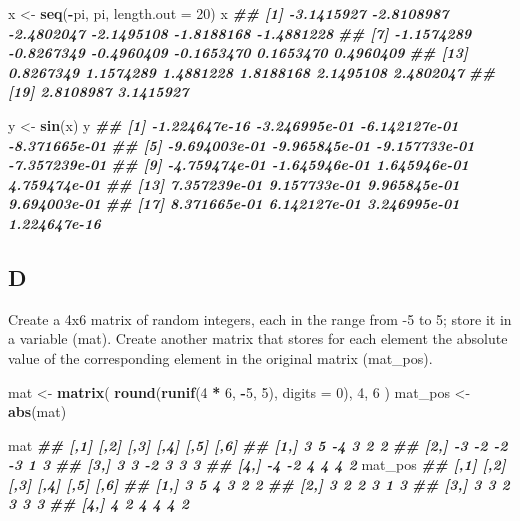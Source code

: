 \documentclass[
]{article}
\newenvironment{Shaded}{\begin{snugshade}}{\end{snugshade}}
\newcommand{\AttributeTok}[1]{\textcolor[rgb]{0.13,0.29,0.53}{#1}}
\newcommand{\DecValTok}[1]{\textcolor[rgb]{0.00,0.00,0.81}{#1}}
\newcommand{\DocumentationTok}[1]{\textcolor[rgb]{0.56,0.35,0.01}{\textbf{\textit{#1}}}}
\newcommand{\FunctionTok}[1]{\textcolor[rgb]{0.13,0.29,0.53}{\textbf{#1}}}
\newcommand{\NormalTok}[1]{#1}
\newcommand{\OtherTok}[1]{\textcolor[rgb]{0.56,0.35,0.01}{#1}}
\newcommand{\SpecialCharTok}[1]{\textcolor[rgb]{0.81,0.36,0.00}{\textbf{#1}}}
\begin{document}
\begin{Shaded}
\begin{Highlighting}[]
\NormalTok{x }\OtherTok{\textless{}{-}} \FunctionTok{seq}\NormalTok{(}\SpecialCharTok{{-}}\NormalTok{pi, pi, }\AttributeTok{length.out =} \DecValTok{20}\NormalTok{)}
\NormalTok{x}
\DocumentationTok{\#\#  [1] {-}3.1415927 {-}2.8108987 {-}2.4802047 {-}2.1495108 {-}1.8188168 {-}1.4881228}
\DocumentationTok{\#\#  [7] {-}1.1574289 {-}0.8267349 {-}0.4960409 {-}0.1653470  0.1653470  0.4960409}
\DocumentationTok{\#\# [13]  0.8267349  1.1574289  1.4881228  1.8188168  2.1495108  2.4802047}
\DocumentationTok{\#\# [19]  2.8108987  3.1415927}

\NormalTok{y }\OtherTok{\textless{}{-}} \FunctionTok{sin}\NormalTok{(x)}
\NormalTok{y}
\DocumentationTok{\#\#  [1] {-}1.224647e{-}16 {-}3.246995e{-}01 {-}6.142127e{-}01 {-}8.371665e{-}01}
\DocumentationTok{\#\#  [5] {-}9.694003e{-}01 {-}9.965845e{-}01 {-}9.157733e{-}01 {-}7.357239e{-}01}
\DocumentationTok{\#\#  [9] {-}4.759474e{-}01 {-}1.645946e{-}01  1.645946e{-}01  4.759474e{-}01}
\DocumentationTok{\#\# [13]  7.357239e{-}01  9.157733e{-}01  9.965845e{-}01  9.694003e{-}01}
\DocumentationTok{\#\# [17]  8.371665e{-}01  6.142127e{-}01  3.246995e{-}01  1.224647e{-}16}
\end{Highlighting}
\end{Shaded}

\hypertarget{d}{%
\subsection{D}\label{d}}

Create a 4x6 matrix of random integers, each in the range from -5 to 5;
store it in a variable (mat). Create another matrix that stores for each
element the absolute value of the corresponding element in the original
matrix (mat\_pos).

\begin{Shaded}
\begin{Highlighting}[]
\NormalTok{mat }\OtherTok{\textless{}{-}} \FunctionTok{matrix}\NormalTok{(}
  \FunctionTok{round}\NormalTok{(}\FunctionTok{runif}\NormalTok{(}\DecValTok{4} \SpecialCharTok{*} \DecValTok{6}\NormalTok{, }\SpecialCharTok{{-}}\DecValTok{5}\NormalTok{, }\DecValTok{5}\NormalTok{), }\AttributeTok{digits =} \DecValTok{0}\NormalTok{),}
  \DecValTok{4}\NormalTok{,}
  \DecValTok{6}
\NormalTok{)}
\NormalTok{mat\_pos }\OtherTok{\textless{}{-}} \FunctionTok{abs}\NormalTok{(mat)}

\NormalTok{mat}
\DocumentationTok{\#\#      [,1] [,2] [,3] [,4] [,5] [,6]}
\DocumentationTok{\#\# [1,]    3    5   {-}4    3    2    2}
\DocumentationTok{\#\# [2,]   {-}3   {-}2   {-}2   {-}3    1    3}
\DocumentationTok{\#\# [3,]    3    3   {-}2    3    3    3}
\DocumentationTok{\#\# [4,]   {-}4   {-}2    4    4    4    2}
\NormalTok{mat\_pos}
\DocumentationTok{\#\#      [,1] [,2] [,3] [,4] [,5] [,6]}
\DocumentationTok{\#\# [1,]    3    5    4    3    2    2}
\DocumentationTok{\#\# [2,]    3    2    2    3    1    3}
\DocumentationTok{\#\# [3,]    3    3    2    3    3    3}
\DocumentationTok{\#\# [4,]    4    2    4    4    4    2}
\end{Highlighting}
\end{Shaded}
\end{document}
